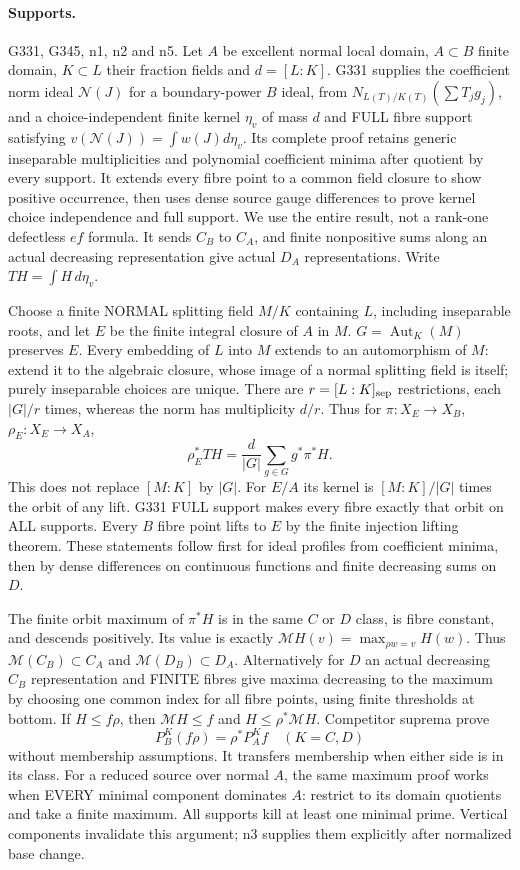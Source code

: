 \paragraph{Supports.} G331, G345, n1, n2 and n5.
Let $A$ be excellent normal local domain, $A\subset B$ finite domain, $K\subset L$ their fraction fields and $d=[L:K]$. G331 supplies the coefficient norm ideal $\mathcal N(J)$ for a boundary-power $B$ ideal, from $N_{L(T)/K(T)}(\sum T_jg_j)$, and a choice-independent finite kernel $\eta_v$ of mass $d$ and FULL fibre support satisfying
$v(\mathcal N(J))=\int w(J)d\eta_v$. Its complete proof retains generic inseparable multiplicities and polynomial coefficient minima after quotient by every support. It extends every fibre point to a common field closure to show positive occurrence, then uses dense source gauge differences to prove kernel choice independence and full support. We use the entire result, not a rank-one defectless $ef$ formula. It sends $C_B$ to $C_A$, and finite nonpositive sums along an actual decreasing representation give actual $D_A$ representations. Write $TH=\int H\,d\eta_v$.

Choose a finite NORMAL splitting field $M/K$ containing $L$, including inseparable roots, and let $E$ be the finite integral closure of $A$ in $M$. $G=\operatorname{Aut}_K(M)$ preserves $E$. Every embedding of $L$ into $M$ extends to an automorphism of $M$: extend it to the algebraic closure, whose image of a normal splitting field is itself; purely inseparable choices are unique. There are $r=[L:K]_{\rm sep}$ restrictions, each $|G|/r$ times, whereas the norm has multiplicity $d/r$. Thus for $\pi:X_E\to X_B$, $\rho_E:X_E\to X_A$,
\[
 \rho_E^*TH=\frac d{|G|}\sum_{g\in G}g^*\pi^*H. \tag{11}
\]
This does not replace $[M:K]$ by $|G|$. For $E/A$ its kernel is $[M:K]/|G|$ times the orbit of any lift. G331 FULL support makes every fibre exactly that orbit on ALL supports. Every $B$ fibre point lifts to $E$ by the finite injection lifting theorem. These statements follow first for ideal profiles from coefficient minima, then by dense differences on continuous functions and finite decreasing sums on $D$.

The finite orbit maximum of $\pi^*H$ is in the same $C$ or $D$ class, is fibre constant, and descends positively. Its value is exactly $\mathcal MH(v)=\max_{\rho w=v}H(w)$. Thus $\mathcal M(C_B)\subset C_A$ and $\mathcal M(D_B)\subset D_A$. Alternatively for $D$ an actual decreasing $C_B$ representation and FINITE fibres give maxima decreasing to the maximum by choosing one common index for all fibre points, using finite thresholds at bottom. If $H\le f\rho$, then $\mathcal MH\le f$ and $H\le\rho^*\mathcal MH$. Competitor suprema prove
\[
 P_B^K(f\rho)=\rho^*P_A^Kf\quad(K=C,D) \tag{12}
\]
without membership assumptions. It transfers membership when either side is in its class. For a reduced source over normal $A$, the same maximum proof works when EVERY minimal component dominates $A$: restrict to its domain quotients and take a finite maximum. All supports kill at least one minimal prime. Vertical components invalidate this argument; n3 supplies them explicitly after normalized base change.

